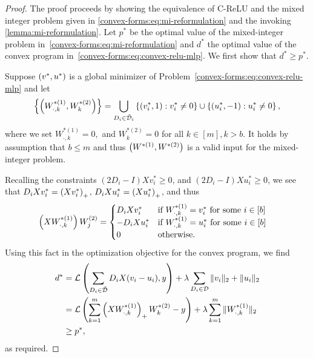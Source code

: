 \convexDualityFree*
\begin{proof}
    The proof proceeds by showing the equivalence of C-ReLU and the mixed integer problem given in \cref{convex-forms:eq:mi-reformulation} and the invoking \cref{lemma:mi-reformulation}.
    Let \( p^* \) be the optimal value of the mixed-integer problem in~\eqref{convex-forms:eq:mi-reformulation} and \( d^* \) the optimal value of the convex program in~\eqref{convex-forms:eq:convex-relu-mlp}.
    We first show that \( d^* \geq p^* \).

    Suppose \( \left(v^*, u^*\right) \) is a global minimizer of Problem~\ref{convex-forms:eq:convex-relu-mlp} and let
    \begin{align*}
        \left\{\left(W^{*(1)}_{\cdot, k}, W^{*(2)}_{k}\right)\right\} = \bigcup_{D_i \in \tilde {\mathcal{D}}_i} \left\{\left(v^*_i, 1\right) : v^*_i \neq 0\right\} \cup \left\{\left(u^*_i, -1\right) : u^*_i \neq 0\right\},
    \end{align*}
    where we set \( W^{*(1)}_{\cdot, k} = 0, \) and \( W^{*(2)}_{k} = 0 \) for all \( k \in [m], k > b \).
    It holds by assumption that \( b \leq m \) and thus \( \left(W^{*(1)}, W^{*(2)}\right) \) is a valid input for the mixed-integer problem.

    Recalling the constraints \( (2 D_i - I) X v^*_i \geq 0 \), and \( (2 D_i - I) X u^*_i \geq 0 \),
    we see that \( D_i X v_i^* = \left(X v_i^*\right)_+ \), \( D_i X u_i^* = \left(X u_i^*\right)_+ \), and thus
    \begin{align*}
        \left(X W^{*(1)}_{\cdot, k}\right) W^{(2)}_{j}
         & = \begin{cases}
                 D_i X v_i^*   & \mbox{if \( W^{*(1)}_{\cdot, k} = v_i^* \) for some \( i \in [b] \)} \\
                 - D_i X u_i^* & \mbox{if \( W^{*(1)}_{\cdot, k} = u_i^* \) for some \( i \in [b] \)} \\
                 0             & \mbox{otherwise}.
             \end{cases}
    \end{align*}
    Using this fact in the optimization objective for the convex program, we find
    \begin{align*}
        d^*
         & = \mathcal{L}\left(\sum_{D_i \in \tilde {\mathcal{D}}} D_i X (v_i - u_i), y\right) + \lambda \sum_{D_i \in \mathcal{D}} \|v_i\|_2 + \|u_i\|_2         \\
         & = \mathcal{L}\left(\sum_{k = 1}^m \left(X W^{*(1)}_{\cdot, k}\right)_+ W^{*(2)}_{k} - y\right) + \lambda \sum_{k = 1}^m \|W^{*(1)}_{\cdot, k}\|_2 \\
         & \geq p^*,
    \end{align*}
    as required.


\end{proof}
